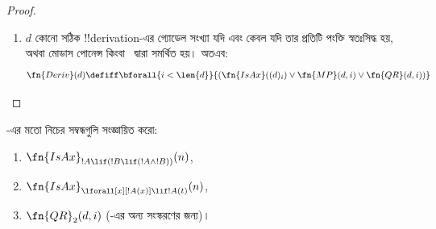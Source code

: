 \documentclass[../../../include/open-logic-section]{subfiles}
\begin{document}
\begin{proof}
\begin{enumerate}
\begin{enumerate}
  \item কোনো !!a{sentence}~$!B$ থাকে এবং
  \item একটিমাত্র মুক্ত চলরাশি~$x$-বিশিষ্ট কোনো !!a{formula}~$!A(x)$ থাকে,
        যাতে
  \item $i$-তম পংক্তিতে $!B \lif \lforall[x][!A(x)]$ থাকে,
  \item কোনো ধ্রুবক~$c$-এর জন্য $j<i$ এমন কোনো পংক্তিতে
        $!B \lif \Subst{!A}{c}{x}$ থাকে,
  \item এবং ওই ধ্রুবকটি যেন~$!B$-তে না ঘটে।
  \end{enumerate}
  এই সবকিছুই আদিম পুনরাবৃত্তভাবে পরীক্ষা করা যায়, কারণ $!B$, $!A(x)$ ও
  $x$-এর গ্যোডেল সংখ্যা $i$-তম পংক্তির সূত্রের গ্যোডেল সংখ্যার চেয়ে
  ছোট, এবং $c$-এর গ্যোডেল সংখ্যা $j$-তম পংক্তির সূত্রের গ্যোডেল সংখ্যার
  চেয়ে ছোট:
  \begin{multline*}
    \fn{QR}_1(d, i) \defiff \bexists{j<i}{\bexists{b < (d)_i}{\bexists{x <
        (d)_i}{\bexists{a < (d)_i}{\bexists{c < (d)_j}{(}}}}}
    \\ \fn{Var}(x) \land \fn{Const}(c) \land {} \\
    (d)_i = \Gn{(} \concat
    b \concat \Gn{\lif} \concat \Gn{\lforall} \concat x \concat a
    \concat \Gn{)} \land {}\\
    (d)_j = \Gn{(} \concat b \concat
    \Gn{\lif} \concat \fn{Subst}(a,c,x) \concat \Gn{)} \land {}\\ \fn{Sent}(b)
    \land \fn{Sent}(\fn{Subst}(a,c,x)) \land {} \bforall{k <
      \len{b}}{(b)_k \neq (c)_0})
  \end{multline*}
  এখানে ধরে নেওয়া হয়েছে, $c$ ও $x$ হলো পদ হিসেবে বিবেচিত ধ্রুবক ও
  চলরাশিটির গ্যোডেল সংখ্যা (অর্থাৎ তাদের প্রতীক-কোড নয়)।
  $\Subst{!A(x)}{c}{x}$ কোনো !!a{sentence} কি না পরীক্ষা করে দেখা হয় যে
  $x$-ই~$!A(x)$-এর একমাত্র মুক্ত চলরাশি; আর~$!B$-এর প্রতিটি প্রতীক~$c$
  থেকে আলাদা চেয়ে নিশ্চিত করা হয় যে $c$ যেন~$!B$-তে না ঘটে।

  \QR{}-এর অন্য সংস্করণটি অনুশীলনী হিসেবে রইল।
\item $d$ কোনো সঠিক !!{derivation}-এর গ্যোডেল সংখ্যা যদি এবং কেবল যদি তার
  প্রতিটি পংক্তি স্বতঃসিদ্ধ হয়, অথবা মোডাস পোনেন্স কিংবা~\QR{} দ্বারা
  সমর্থিত হয়। অতএব:
  \[
  \fn{Deriv}(d) \defiff \bforall{i < \len{d}}{(\fn{IsAx}((d)_i) \lor
    \fn{MP}(d,i) \lor \fn{QR}(d, i))}
  \]
\end{enumerate}
\end{proof}

\begin{prob}
-এর মতো নিচের সম্বন্ধগুলি সংজ্ঞায়িত
করো:
\begin{enumerate}
\item $\fn{IsAx}_{!A \lif (!B \lif (!A \land !B))}(n)$,
\item $\fn{IsAx}_{\lforall[x][!A(x)] \lif !A(t)}(n)$,
\item $\fn{QR}_{2}(d, i)$ (\QR{}-এর অন্য সংস্করণের জন্য)।
\end{enumerate}
\end{prob}
\end{document}
